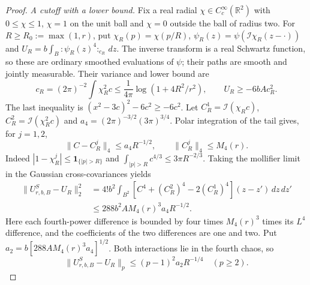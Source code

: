 \documentclass[11pt]{article}
\theoremstyle{plain}
\theoremstyle{definition}
\theoremstyle{remark}
\newcommand{\R}{\mathbb{R}}
\newcommand{\cI}{\mathcal{I}}
\newcommand{\ind}{\mathbf{1}}
\begin{document}
\begin{proof}
\emph{A cutoff with a lower bound.} Fix a real radial
$\chi\in C_c^\infty(\R^2)$ with $0\le\chi\le1$, $\chi=1$ on the unit ball
and $\chi=0$ outside the ball of radius two. For
$R\ge R_0:=\max(1,r)$, put $\chi_R(p)=\chi(p/R)$,
$\psi_R(z)=\psi(\cI\chi_R(z-\cdot))$ and
$U_R=b\int_B{:}\psi_R(z)^4{:}_{c_R}\,dz$. The inverse transform is a real
Schwartz function, so these are ordinary smoothed evaluations of $\psi$;
their paths are smooth and jointly measurable. Their variance and lower bound
are
\begin{equation}\label{eq:classical-cutoff-variance}
 c_R=(2\pi)^{-2}\int\chi_R^2c
 \le\frac1{4\pi}\log(1+4R^2/r^2),\qquad
 U_R\ge-6bA c_R^2.
\end{equation}
The last inequality is $(x^2-3c)^2-6c^2\ge-6c^2$.
Let $C_R^1=\cI(\chi_Rc)$, $C_R^2=\cI(\chi_R^2c)$ and
$a_4=(2\pi)^{-3/2}(3\pi)^{3/4}$. Polar integration of the tail gives,
for $j=1,2$,
\begin{equation}\label{eq:classical-covariance-tail}
 \|C-C_R^j\|_4\le a_4R^{-1/2},\qquad
 \|C_R^j\|_4\le M_4(r).
\end{equation}
Indeed $|1-\chi_R^j|\le\ind_{\{|p|>R\}}$ and
$\int_{|p|>R}c^{4/3}\le3\pi R^{-2/3}$.
Taking the mollifier limit in the Gaussian cross-covariances yields
\begin{align}
 \|U^S_{r,b,B}-U_R\|_2^2
 &=4!b^2\int_{B^2}[C^4+(C_R^2)^4-2(C_R^1)^4](z-z')\,dz\,dz'
 \nonumber\\
 &\le288 b^2 A M_4(r)^3a_4 R^{-1/2}.
 \label{eq:classical-interaction-tail}
\end{align}
Here each fourth-power difference is bounded by four times $M_4(r)^3$
times its $L^4$ difference, and the coefficients of the two differences
are one and two. Put $a_2=b[288 A M_4(r)^3a_4]^{1/2}$. Both interactions
lie in the fourth chaos, so
\begin{equation}\label{eq:classical-hypercontractivity}
 \|U^S_{r,b,B}-U_R\|_p\le(p-1)^2a_2R^{-1/4}\quad(p\ge2).
\end{equation}


\end{proof}
\end{document}
